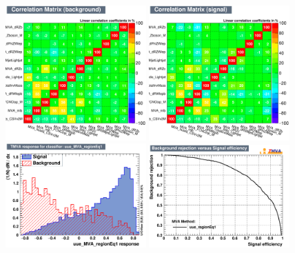 \begin{figure}[htbp]
	\includegraphics[width=0.48\textwidth]{6_Search/Figures/MVAtechnics/toppairzct/uue/CorrelationMatrixB.png}
	\includegraphics[width=0.48\textwidth]{6_Search/Figures/MVAtechnics/toppairzct/uue/CorrelationMatrixS.png}
	\includegraphics[width=0.48\textwidth]{6_Search/Figures/MVAtechnics/toppairzct/uue/mva_uue_MVA_regionEq1.png}
	\includegraphics[width=0.48\textwidth]{6_Search/Figures/MVAtechnics/toppairzct/uue/rejBvsS.png}

\end{figure}
